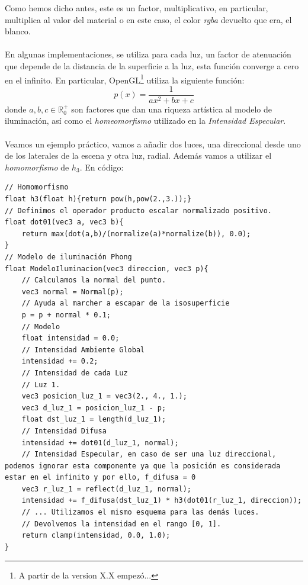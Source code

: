 Como hemos dicho antes, este es un factor, multiplicativo, en particular, multiplica al valor del material o en este caso, el color \textit{rgba} devuelto que era, el blanco.\\\\
En algunas implementaciones, se utiliza para cada luz, un factor de atenuación que depende de la distancia de la superficie a la luz, esta función converge a cero en el infinito. En particular, OpenGL\footnote{A partir de la version X.X empezó...} utiliza la siguiente función:
\[p(x)=\dfrac{1}{ax^2+bx+c}\]
donde \(a,b,c \in \mathbb{R}^{+}_{0}\) son factores que dan una riqueza artística al modelo de iluminación, así como el \textit{homeomorfismo} utilizado en la \textit{Intensidad Especular}.\\\\
Veamos un ejemplo práctico, vamos a añadir dos luces, una direccional desde uno de los laterales de la escena y otra luz, radial. Además vamos a utilizar el \textit{homomorfismo} de \(h_3\). En código:
\begin{lstlisting}
// Homomorfismo
float h3(float h){return pow(h,pow(2.,3.));}
// Definimos el operador producto escalar normalizado positivo.
float dot01(vec3 a, vec3 b){ 
    return max(dot(a,b)/(normalize(a)*normalize(b)), 0.0);
}
// Modelo de iluminación Phong
float ModeloIluminacion(vec3 direccion, vec3 p){
    // Calculamos la normal del punto.
    vec3 normal = Normal(p);
    // Ayuda al marcher a escapar de la isosuperficie
    p = p + normal * 0.1;
    // Modelo
    float intensidad = 0.0;
    // Intensidad Ambiente Global
    intensidad += 0.2;
    // Intensidad de cada Luz
    // Luz 1.
    vec3 posicion_luz_1 = vec3(2., 4., 1.);
    vec3 d_luz_1 = posicion_luz_1 - p;
    float dst_luz_1 = length(d_luz_1);
    // Intensidad Difusa
    intensidad += dot01(d_luz_1, normal);
    // Intensidad Especular, en caso de ser una luz direccional, podemos ignorar esta componente ya que la posición es considerada estar en el infinito y por ello, f_difusa = 0
    vec3 r_luz_1 = reflect(d_luz_1, normal);
    intensidad += f_difusa(dst_luz_1) * h3(dot01(r_luz_1, direccion));
    // ... Utilizamos el mismo esquema para las demás luces.
    // Devolvemos la intensidad en el rango [0, 1].
    return clamp(intensidad, 0.0, 1.0);
}
\end{lstlisting}
